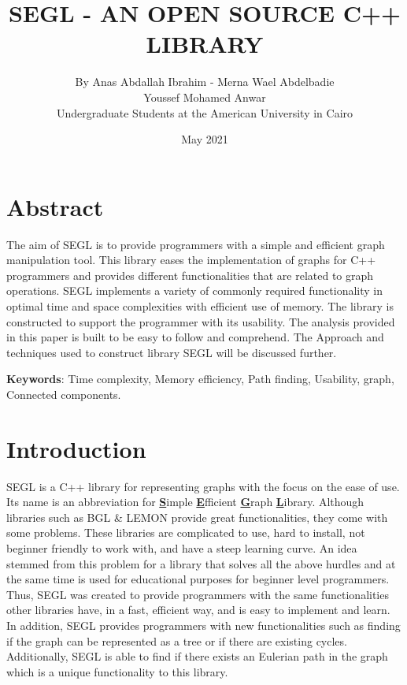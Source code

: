 \documentclass[a4paper,12pt]{article}
\begin{document}
\title{\textbf{SEGL - AN OPEN SOURCE C++ LIBRARY}}
\author{By Anas Abdallah Ibrahim - Merna Wael Abdelbadie \\ Youssef Mohamed Anwar \\ Undergraduate Students at the American University in Cairo}

\date{May 2021}

\maketitle

\section{Abstract}
The aim of SEGL is to provide programmers with a simple and efficient graph manipulation tool. This library eases the implementation of graphs for C++ programmers and provides different functionalities that are related to graph operations. SEGL implements a variety of commonly required functionality in optimal time and space complexities with efficient use of memory. The library is constructed to support the programmer with its usability.  The analysis provided in this paper is built to be easy to follow and comprehend. The Approach and techniques used to construct library SEGL will be discussed further.



\textbf{Keywords}: Time complexity, Memory efficiency, Path finding, Usability, graph, Connected components.
\section{Introduction}
SEGL is a C++ library for representing graphs with the focus on the ease of use. Its name is an abbreviation for \underline{\textbf{S}}imple \underline{\textbf{E}}fficient \underline{\textbf{G}}raph \underline{\textbf{L}}ibrary.  Although libraries such as BGL \& LEMON provide great functionalities, they come with some problems. These libraries are complicated to use, hard to install, not beginner friendly to work with, and have a steep learning curve. An idea stemmed from this problem for a library that solves all the above hurdles and at the same time is used for educational purposes for beginner level programmers. Thus, SEGL was created to provide programmers with the same functionalities other libraries have, in a fast, efficient way, and is easy to implement and learn. In addition, SEGL provides programmers with new functionalities such as finding if the graph can be represented as a tree or if there are existing cycles. Additionally, SEGL is able to find if there exists an Eulerian path in the graph which is a unique functionality to this library.\\
\end{document}
